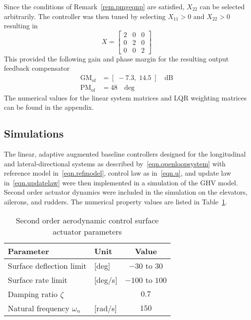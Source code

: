 \documentclass[]{../sty/aiaa-tc}
\begin{document}
  Since the conditions of Remark~\ref{rem.pmgeqnp} are satisfied, $X_{22}$ can be selected arbitrarily.
  The controller was then tuned by selecting $X_{11}>0$ and $X_{22}>0$ resulting in
  \begin{equation*}
    X=
    \left[
    \begin{array}{ccccc}
      2 & 0 & 0 \\
      0 & 2 & 0 \\
      0 & 0 & 2
    \end{array}\right]
  \end{equation*}
  This provided the following gain and phase margin for the resulting output feedback compensator
  \begin{align*}
    \text{GM}_{\text{of}}&=[\;-7.3,\; 14.5 \;] \quad \text{dB}\\
    \text{PM}_{\text{of}}&=48 \quad \text{deg}
  \end{align*}
  The numerical values for the linear system matrices and LQR weighting matrices can be found in the appendix.

  \subsection{Simulations}

  The linear, adaptive augmented baseline controllers designed for the longitudinal and lateral-directional systems as described by\ \eqref{eqn.openloopsystem} with reference model in\ \eqref{eqn.refmodel}, control law as in\ \eqref{eqn.u}, and update law in\ \eqref{eqn.updatelaw} were then implemented in a simulation of the GHV model.
  Second order actuator dynamics were included in the simulation on the elevators, ailerons, and rudders.
  The numerical property values are listed in Table~\ref{tab:actuator}.

  \begin{table}[H]
    \centering
    \caption{Second order aerodynamic control surface actuator parameters\label{tab:actuator}}
    \begin{tabular}{llc}
      \toprule
      Parameter & Unit & Value \\ \midrule
      Surface deflection limit & [deg] & $-30$ to $30$ \\
      Surface rate limit & [deg/s] & $-100$ to $100$ \\
      Damping ratio $\zeta$ & & $0.7$ \\
      Natural frequency $\omega_{n}$ & [rad/s] & $150$ \\
      \bottomrule
    \end{tabular}
  \end{table}
\end{document}
